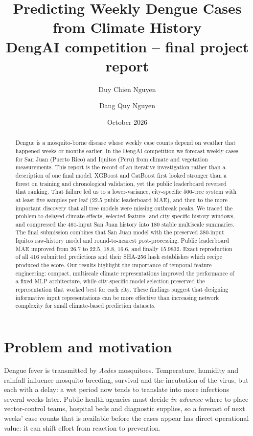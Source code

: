\documentclass[11pt,a4paper]{article}
\title{\vspace{-1cm}\textbf{Predicting Weekly Dengue Cases from Climate History}\\[4pt]
\normalsize DengAI competition -- final project report}
\author{Duy Chien Nguyen \and Dang Quy Nguyen}
\date{October 2026}
\begin{document}
\maketitle

\begin{abstract}
\noindent
Dengue is a mosquito-borne disease whose weekly case counts depend on weather that happened weeks or months earlier. In the DengAI competition we forecast weekly cases for San Juan (Puerto Rico) and Iquitos (Peru) from climate and vegetation measurements. This report is the record of an iterative investigation rather than a description of one final model. XGBoost and CatBoost first looked stronger than a forest on training and chronological validation, yet the public leaderboard reversed that ranking. That failure led us to a lower-variance, city-specific $500$-tree system with at least five samples per leaf ($22.5$ public leaderboard MAE), and then to the more important discovery that all tree models were missing outbreak peaks. We traced the problem to delayed climate effects, selected feature- and city-specific history windows, and compressed the $461$-input San Juan history into $180$ stable multiscale summaries. The final submission combines that San Juan model with the preserved $380$-input Iquitos raw-history model and round-to-nearest post-processing. Public leaderboard MAE improved from $26.7$ to $22.5$, $18.8$, $16.6$, and finally $\mathbf{15.9832}$. Exact reproduction of all $416$ submitted predictions and their SHA-256 hash establishes which recipe produced the score. Our results highlight the importance of temporal
feature engineering: compact, multiscale climate
representations improved the performance of a fixed
MLP architecture, while city-specific model selection
preserved the representation that worked best for each
city. These findings suggest that designing
informative input representations can be more
effective than increasing network complexity
for small climate-based prediction datasets.
\end{abstract}

\tableofcontents
\newpage

\section{Problem and motivation}
Dengue fever is transmitted by \emph{Aedes} mosquitoes. Temperature, humidity and rainfall influence mosquito breeding, survival and the incubation of the virus, but each with a delay: a wet period now tends to translate into more infections several weeks later. Public-health agencies must decide \emph{in advance} where to place vector-control teams, hospital beds and diagnostic supplies, so a forecast of next weeks' case counts that is available before the cases appear has direct operational value: it can shift effort from reaction to prevention.
\end{document}
